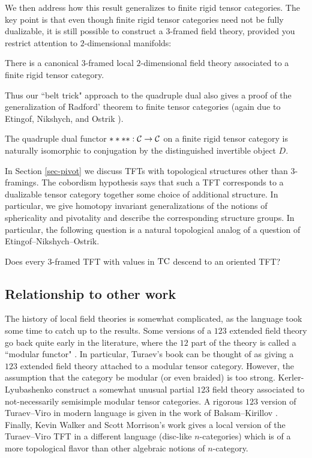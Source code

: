 \documentclass{amsart}
\begin{document}
We then address how this result generalizes to finite rigid tensor categories.  The key point is that even though finite rigid tensor categories need not be fully dualizable, it is still possible to construct a $3$-framed field theory, provided you restrict attention to $2$-dimensional manifolds:

\begin{theorem}
There is a canonical $3$-framed local $2$-dimensional field theory associated to a finite rigid tensor category.
\end{theorem}

Thus our ``belt trick" approach to the quadruple dual also gives a proof of the generalization of Radford' theorem to finite tensor categories (again due to Etingof, Nikshych, and Ostrik \cite{MR2097289}).

\begin{corollary}
The quadruple dual functor $****: \mathcal C \rightarrow \mathcal C$ on a finite rigid tensor category is naturally isomorphic to conjugation by the distinguished invertible object $D$.
\end{corollary}

In Section \ref{sec-pivot} we discuss TFTs with topological structures other than $3$-framings.  The cobordism hypothesis says that such a TFT corresponds to a dualizable tensor category together some choice of additional structure.  In particular, we give homotopy invariant generalizations of the notions of sphericality and pivotality and describe the corresponding structure groups.  In particular, the following question is a natural topological analog of a question of Etingof--Nikshych--Ostrik.

\begin{question}
Does every $3$-framed TFT with values in $\mathrm{TC}$ descend to an oriented TFT?
\end{question}

\subsection{Relationship to other work}

The history of local field theories is somewhat complicated, as the language took some time to catch up to the results.  Some versions of a $123$ extended field theory go back quite early in the literature, where the $12$ part of the theory is called a ``modular functor" \cite{Segal, MR1002038, MR1159969,MR1797619}.  In particular, Turaev's book \cite{MR1292673} can be thought of as giving a $123$ extended field theory attached to a modular tensor category.  However, the assumption that the category be modular (or even braided) is too strong.  Kerler-Lyubashenko \cite{MR1862634} construct a somewhat unusual partial $123$ field theory associated to not-necessarily semisimple modular tensor categories.   A rigorous $123$ version of Turaev--Viro in modern language is given in the work of Balsam--Kirillov \cite{1004.1533}.  Finally, Kevin Walker and Scott Morrison's work \cite{kw:tqft, 1009.5025} gives a local version of the Turaev--Viro TFT in a different language (disc-like $n$-categories) which is of a more topological flavor than other algebraic notions of $n$-category.
\end{document}
